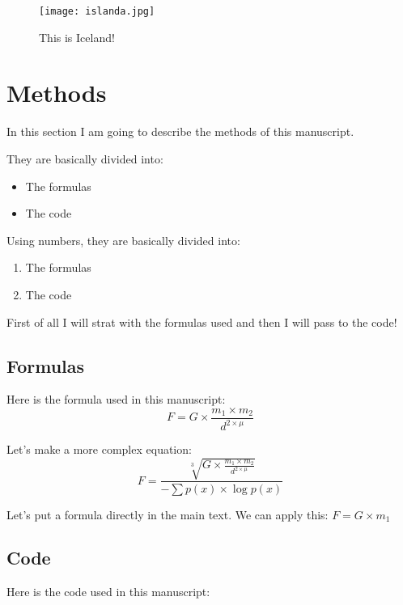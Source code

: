 \documentclass[a4paper, 12pt]{article} %
\begin{document}
\begin{figure}
\centering
 \texttt{[image: islanda.jpg]}
 \caption{This is Iceland!}
 \label{fig:islanda}
\end{figure}

\section{Methods}
In this section I am going to describe the methods of this manuscript.

They are basically divided into:
\begin{itemize} %
 \item The formulas
 \item The code
\end{itemize}

Using numbers, they are basically divided into:
\begin{enumerate} %
 \item The formulas
 \item The code
\end{enumerate}

First of all I will strat with the formulas used and then I will pass to the code!

\subsection{Formulas}
Here is the formula used in this manuscript:
\begin{equation} %
F = G \times \frac{m_{1} \times m_{2}}{d^{2 \times \mu}}
\label{eq:newton}
\end{equation}

Let's make a more complex equation:
\begin{equation}
F = \frac{{}\sqrt[3]{G \times \frac{m_{1} \times m_{2}}{d^{2 \times \mu }}}}{-\sum{p(x) \times \log{p(x)}}}
\end{equation} 

Let's put a formula directly in the main text.
We can apply this: $F=G \times m_{1}$

\subsection{Code}
Here is the code used in this manuscript:
\end{document}
